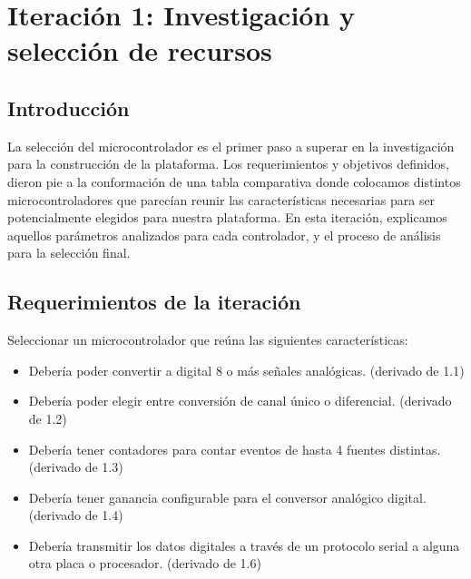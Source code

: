 \chapter{Iteración 1: Investigación y selección de recursos} %
\label{cha:iteracion_1}

\section{Introducción} %
\label{it1:sec:introduccion}

La selección del microcontrolador es el primer paso a superar en la investigación para la construcción de la plataforma. Los requerimientos y objetivos definidos, dieron pie a la conformación de una tabla comparativa donde colocamos distintos microcontroladores que parecían reunir las características necesarias para ser potencialmente elegidos para nuestra plataforma. En esta iteración, explicamos aquellos parámetros analizados para cada controlador, y el proceso de análisis para la selección final.




\section{Requerimientos de la iteración} %
\label{it1:sec:requerimientos_de_la_iteracion}

Seleccionar un microcontrolador que reúna las siguientes características:
\begin{itemize}
  \item Debería poder convertir a digital 8 o más señales analógicas. (derivado de 1.1)
  \item Debería poder elegir entre conversión de canal único o diferencial. (derivado de 1.2)
  \item Debería tener contadores para contar eventos de hasta 4 fuentes distintas. (derivado de 1.3)
  \item Debería tener ganancia configurable para el conversor analógico digital. (derivado de 1.4)
  \item Debería transmitir los datos digitales a través de un protocolo serial a alguna otra placa o procesador. (derivado de 1.6)
\end{itemize}



